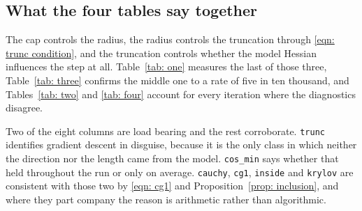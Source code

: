 \documentclass[11pt,a4paper]{article}
\theoremstyle{remark}
\begin{document}
\subsection{What the four tables say together}\label{sec: together}

The cap controls the radius, the radius controls the truncation through
\eqref{eqn: trunc condition}, and the truncation controls whether the model
Hessian influences the step at all. Table~\ref{tab: one} measures the last of
those three, Table~\ref{tab: three} confirms the middle one to a rate of five in
ten thousand, and Tables~\ref{tab: two} and \ref{tab: four} account for every
iteration where the diagnostics disagree.

Two of the eight columns are load bearing and the rest corroborate.
\texttt{trunc} identifies gradient descent in disguise, because it is the only
class in which neither the direction nor the length came from the model.
\texttt{cos\_min} says whether that held throughout the run or only on average.
\texttt{cauchy}, \texttt{cg1}, \texttt{inside} and \texttt{krylov} are consistent
with those two by \eqref{eqn: cg1} and Proposition~\ref{prop: inclusion}, and
where they part company the reason is arithmetic rather than algorithmic.
\end{document}
